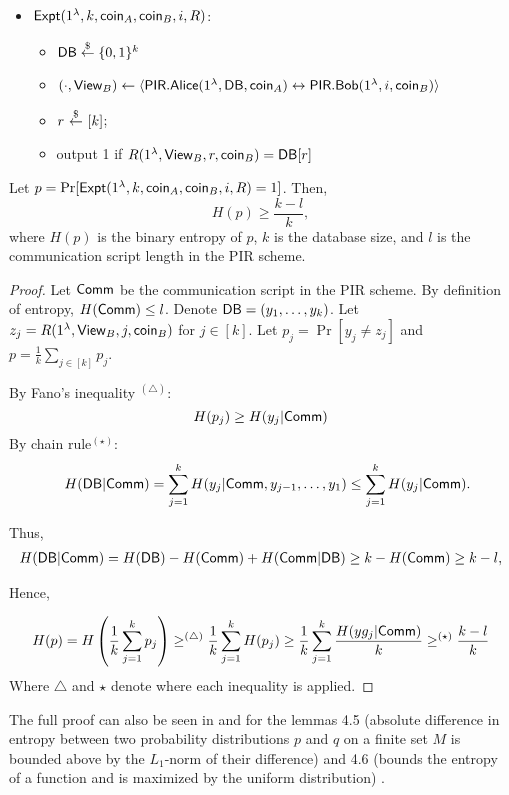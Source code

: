 \begin{itemize}
\item
${\sf Expt}(1^\lambda, k, {\sf coin}_A, {\sf coin}_B, i, R)$:
\begin{itemize}
\item ${\sf DB} \stackrel{\$}{\leftarrow}\{0,1\}^k$ 
    \item $(\cdot,{\sf View}_B)\leftarrow \langle{\sf PIR}.{\sf Alice}(1^{\lambda}, {\sf DB}, {\sf coin}_A) \leftrightarrow {\sf PIR}.{\sf Bob}(1^{\lambda}, i, {\sf coin}_B)\rangle$
    \item $r~{\overset{\$}{\leftarrow}}~ [k]$;
    \item output 1 if $R(1^\lambda, {\sf View}_B, r, {\sf coin}_B) = {\sf DB}[r]$
\end{itemize}
\end{itemize}

\begin{claim}
    Let 
    $p = \Pr[{\sf Expt}(1^\lambda, k, {\sf coin}_A, {\sf coin}_B, i, R)=1]$. Then, 
    $$H(p) \geq \frac{k-l}{k},$$ where $H(p)$ is the binary entropy of $p$, $k$ is the database size, and $l$ is the communication script length in the PIR scheme.
\end{claim}

\begin{proof}
Let ${\sf Comm}$ be the communication script in the PIR scheme.
By definition of entropy, $H({\sf Comm}) \leq l$.
Denote ${\sf DB}=(y_1,\dots,y_k)$. Let $z_j = R (1^\lambda, {\sf View}_{B}, j, {\sf coin}_B)$ for $j \in [k]$.
Let $p_j = \Pr[y_j\ne z_j]$ and $p = \frac{1}{k} \sum_{j \in [k]} p_j$.

\noindent By Fano's inequality $^{(\triangle)}$: $$H(p_j) \geq H(y_j | {\sf Comm})$$
By chain rule$^{(\star)}$: 
\[
\quad H({\sf DB} | {\sf Comm}) = \sum_{j=1}^{k} H(y_{j} | {\sf Comm}, y_{j-1}, \ldots, y_1) \leq \sum_{j=1}^{k} H(y_{j}| {\sf Comm}).
\]

Thus,
\begin{align*}
H({{\sf DB}}|{\sf Comm}) = H({{\sf DB}}) - H({\sf Comm}) + H({\sf Comm} |{{\sf DB}}) \geq k - H({\sf Comm})
\geq k - l,
\end{align*}

Hence,

$$H(p) = H\left( \frac{1}{k} \sum_{j=1}^{k} p_j \right) \geq^{(\triangle)}  \frac{1}{k} \sum_{j=1}^{k} H(p_j)\geq \frac{1}{k} \sum_{j=1}^{k}\frac{H(y g_j | {\sf Comm})}{k} \geq^{(\star)} \frac{k - l}{k}$$
Where $\triangle$ and $\star$ denote where each inequality is applied.
\end{proof}

The full proof can also be seen in \cite{DLN19}
and for the lemmas 4.5 (absolute difference in entropy between two probability distributions $p$ and $q$ on a finite set $M$ is bounded above by the $L_{1}\text{-norm}$ of their difference) and 4.6 (bounds the entropy of a function and is maximized by the uniform distribution) \cite{669255}.

